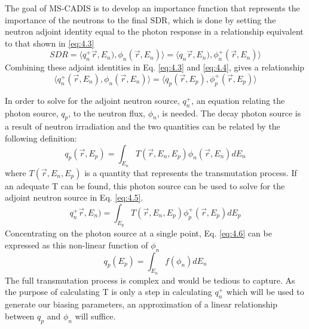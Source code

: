 The goal of MS-CADIS is to develop an importance function that represents the
importance of the neutrons to the final SDR, which is done by setting the
neutron adjoint identity equal to the photon response in a relationship
equivalent to that shown in \ref{eq:4.3}
\begin{equation} \label{eq:4.4}
  SDR =  \langle q_{n}^{+}\overrightarrow{r},E_{n}),
  \phi_{n}(\overrightarrow{r}, E_{n}) \rangle 
  = \langle q_{n}\overrightarrow{r},E_{n}),
  \phi_{n}^{+}(\overrightarrow{r}, E_{n}) \rangle 
\end{equation}
Combining these adjoint identities in Eq. \ref{eq:4.3} and \ref{eq:4.4}, 
gives a relationship
\begin{equation} \label{eq:4.5}
	\langle q_{n}^{+}(\overrightarrow{r},E_{n}),
  \phi_{n}(\overrightarrow{r}, E_{n}) \rangle 
	= \langle q_{p}(\overrightarrow{r},E_{p}),
  \phi_{p}^{+}(\overrightarrow{r}, E_{p}) \rangle 
\end{equation}

In order to solve for the adjoint neutron source, $q_n^{+}$, an equation
relating the photon source, $q_p$, to the neutron flux, $\phi_n$, is needed.
The decay photon source is a result of neutron irradiation and 
the two quantities can be related by the following
definition:
\begin{equation} \label{eq:4.6}
	q_p(\overrightarrow{r}, E_{p}) = 
	\int_{E_n}T(\overrightarrow{r}, E_{n}, E_{p})
	\phi_{n}(\overrightarrow{r}, E_{n}) dE_{n}
\end{equation}
where $T(\overrightarrow{r}, E_{n}, E_{p})$ is a quantity that represents the
transmutation process.  If an adequate T can be found, this photon source can
be used to solve for the adjoint neutron source in Eq. \ref{eq:4.5}.
\begin{equation} \label{eq:4.7}
        q_{n}^{+}\overrightarrow{r},E_{n})
        = \int_{E_p}T(\overrightarrow{r}, E_{n}, E_{p})
	\phi_{p}^{+}(\overrightarrow{r}, E_{p}) dE_{p}
\end{equation}
Concentrating on the photon source at a single point, Eq. \ref{eq:4.6} can be
expressed as this non-linear function of $\phi_n$ 
\begin{equation} \label{eq:4.8}
	q_{p}(E_{p}) = \int_{E_n} f(\phi_{n}) dE_{n}
\end{equation}
The full transmutation process is complex and would be
tedious to capture.  As the purpose of calculating T is only a step in
calculating $q_{n}^{+}$ which will be used to generate our biasing parameters,
an approximation of a linear relationship between $q_p$ and $\phi_n$ will suffice.  



